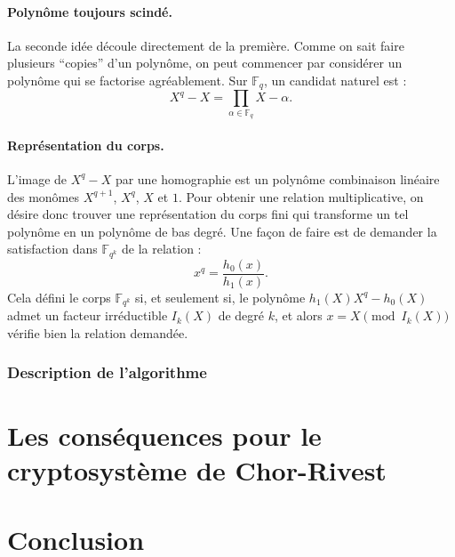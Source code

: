 \documentclass[a4paper, titlepage, 11pt]{article}
\theoremstyle{definition}
\theoremstyle{remark}
\def\gf #1{\mathbb{F}_{#1}}
\begin{document}
\paragraph*{Polynôme toujours scindé.} La seconde idée découle directement de la première. Comme on sait faire plusieurs ``copies'' d'un polynôme, on peut commencer par considérer un polynôme qui se factorise agréablement. Sur $\gf{q}$, un candidat naturel est : $$X^q -X = \prod_{\alpha\in\gf{q}} X-\alpha.$$

\paragraph*{Représentation du corps.} L'image de $X^q-X$ par une homographie est un polynôme combinaison linéaire des monômes $X^{q+1}$, $X^q$, $X$ et $1$. Pour obtenir une relation multiplicative, on désire donc trouver une représentation du corps fini qui transforme un tel polynôme en un polynôme de bas degré. Une façon de faire est de demander la satisfaction dans $\gf{q^k}$ de la relation :
$$x^q = \frac{h_0(x)}{h_1(x)}.$$
Cela défini le corps $\gf{q^k}$ si, et seulement si, le polynôme $h_1(X)X^q - h_0(X)$ admet un facteur irréductible $I_k(X)$ de degré $k$, et alors $x = X \pmod{I_k(X)}$ vérifie bien la relation demandée.

\subsubsection{Description de l'algorithme}

\section{Les conséquences pour le cryptosystème de Chor-Rivest}\label{sec:consequences}

\section*{Conclusion}

\newpage
\thispagestyle{empty}


\end{document}
